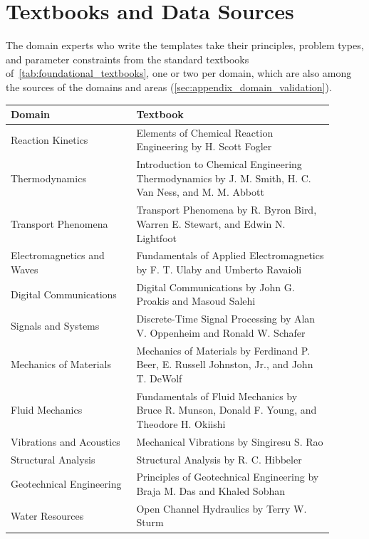 \section{Textbooks and Data Sources}
\label{sec:appendix_books}
\label{sec:appendix_data_sources}

The domain experts who write the templates take their principles, problem types, and parameter
constraints from the standard textbooks of~\autoref{tab:foundational_textbooks}, one or two per
domain, which are also among the sources of the domains and areas
(\autoref{sec:appendix_domain_validation}).

\begin{table}[t]
\small
\centering
\renewcommand{\arraystretch}{1.1}
\setlength{\tabcolsep}{6pt}
\begin{tabular}{p{0.35\linewidth} p{0.55\linewidth}}
\toprule
\rowcolor{gray!10}\textbf{Domain} & \textbf{Textbook} \\
\midrule
Reaction Kinetics & Elements of Chemical Reaction Engineering by H. Scott Fogler \\
Thermodynamics & Introduction to Chemical Engineering Thermodynamics by J. M. Smith, H. C. Van Ness,
and M. M. Abbott \\
Transport Phenomena & Transport Phenomena by R. Byron Bird, Warren E. Stewart, and Edwin N.
Lightfoot \\
\addlinespace[2pt]
Electromagnetics and Waves & Fundamentals of Applied Electromagnetics by F. T. Ulaby and Umberto
Ravaioli \\
Digital Communications & Digital Communications by John G. Proakis and Masoud Salehi \\
Signals and Systems & Discrete-Time Signal Processing by Alan V. Oppenheim and Ronald W. Schafer \\
\addlinespace[2pt]
Mechanics of Materials & Mechanics of Materials by Ferdinand P. Beer, E. Russell Johnston, Jr., and
John T. DeWolf \\
Fluid Mechanics & Fundamentals of Fluid Mechanics by Bruce R. Munson, Donald F. Young, and Theodore
H. Okiishi \\
Vibrations and Acoustics & Mechanical Vibrations by Singiresu S. Rao \\
\addlinespace[2pt]
Structural Analysis & Structural Analysis by R. C. Hibbeler \\
Geotechnical Engineering & Principles of Geotechnical Engineering by Braja M. Das and Khaled
Sobhan \\
Water Resources & Open Channel Hydraulics by Terry W. Sturm \newline

\end{tabular}
\end{table}
